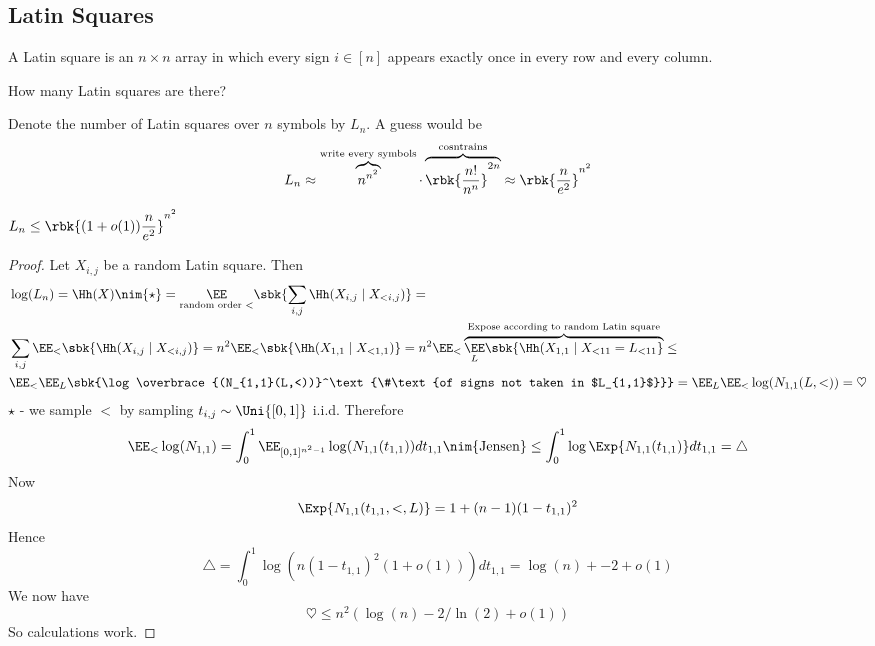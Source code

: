 \documentclass[a4paper, 11pt, oneside]{book}
\begin{document}
\subsection{Latin Squares}
\begin{yellowBox}
\begin{defn}
	[LatinSquare] A Latin square is an $n\times n$ array in which every sign $i\in [n]$ appears exactly once in every row and every column.
\end{defn}	

\end{yellowBox}
\begin{question}
	How many Latin squares are there?
\end{question}
Denote the number of Latin squares over $n$ symbols by $L_n$. A guess would be \[L_n \approx \overbrace{n^{n^2}}^\text{write every symbols}\cdot\overbrace{\rbk{\frac{n!}{n^n}}^{2n}}^\text{cosntrains} \approx \rbk{\frac{n}{e^2}}^{n^2}\]
\begin{thm}
	${\displaystyle L_n \le \rbk{(1+o(1))\frac{n}{e^2}}^{n^2}}$
\end{thm}
\begin{proof}
	Let $X_{i,j}$ be a random Latin square. Then
	\begin{align*}
		&\log(L_n) = \Hh(X) \nim{\star}= \underset{\text{random order }<}{\EE}\sbk{\sum_{i,j}\Hh(X_{i,j}\mid X_{<{i,j}})} = \\
		&\sum_{i,j}\EE_{<}\sbk{\Hh(X_{i,j}\mid X_{<i,j})} = n^2\EE_{<}\sbk{\Hh(X_{1,1}\mid X_{<1,1})} = n^2 \EE_< \overbrace{\underset{L}{\EE}\sbk{\Hh(X_{1,1}\mid X_{<11} = L_{<11}}}^\text{Expose according to random Latin square} \le \\
		& \EE_< \EE_L \sbk{\log\overbrace{(N_{1,1}(L,<))}^\text{\#\text{of signs not taken in $L_{1,1}$}}} = \EE_L \EE_< \log(N_{1,1}(L,<)) = \heartsuit
	\end{align*}
	$\star $ - we sample $<$ by sampling $t_{i,j}\sim \Uni{[0,1]}$ i.i.d. Therefore \[
	\EE_< \log(N_{1,1}) = \int_0^1 \EE_{[0,1]^{n^2-1}}\log(N_{1,1}(t_{1,1})) dt_{1,1} \nim{\text{Jensen}}\le \int_0^1 \log \Exp{N_{1,1}(t_{1,1})}dt_{1,1} = \triangle
	\]
	Now
	\[
	\Exp{N_{1,1}(t_{1,1},<,L)} = 1 + (n-1)(1-t_{1,1})^2
	\]
	Hence 
	\[
	\triangle = \int_0^1 \log(n(1-t_{1,1})^2(1+o(1)))dt_{1,1} = \log(n) + -2 + o(1)
	\]
	We now have
	\[
	\heartsuit \le n^2(\log(n) - 2/\ln(2) + o(1))
	\]
So calculations work.
	\end{proof}
\end{document}
